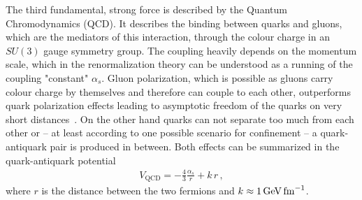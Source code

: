The third fundamental, strong force is described by the Quantum Chromodynamics
(QCD). It describes the binding between quarks and gluons, which are the
mediators of this interaction, through the colour charge in an $SU(3)$ gauge
symmetry group. The coupling heavily depends on the momentum scale, which in
the renormalization theory can be understood as a running of the coupling
"constant" $\alpha_s$. Gluon polarization, which is possible as gluons carry
colour charge by themselves and therefore can couple to each other,
outperforms quark polarization effects leading to asymptotic freedom of the
quarks on very short
distances~\cite{AsymptoticFreedom_GrossWilczek,AsymptoticFreedom_Politzer}. On
the other hand quarks can not separate too much from each other or -- at least
according to one possible scenario for confinement -- a quark-antiquark pair
is produced in between. Both effects can be summarized in the quark-antiquark
potential
\begin{align}
	V_{\mathrm{QCD}} = - \frac 43 \frac{\alpha_s}{r} + k\,r\,,
\end{align}
where $r$ is the distance between the two fermions and $k \approx
\SI{1}{\GeV\fm^{-1}}$.
